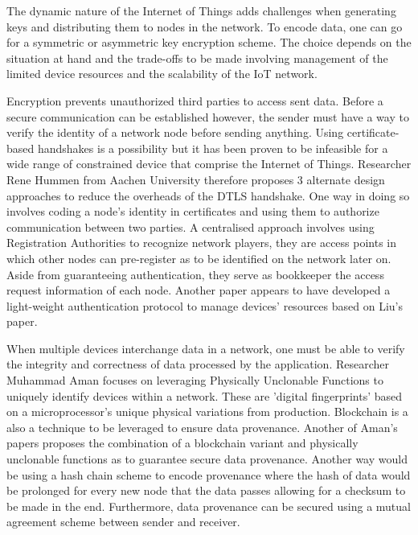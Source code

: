\documentclass[14]{article}
\begin{document}
The dynamic nature of the Internet of Things adds challenges when generating keys\cite{roman2011key} and distributing them to nodes in the network. To encode data, one can go for a symmetric\cite{gomes2014internet} or asymmetric key encryption scheme. The choice depends on the situation at hand and the trade-offs to be made involving management of the limited device resources\cite{katagi2008lightweight} and the scalability of the IoT network\cite{gomes2014internet}.

Encryption prevents unauthorized third parties to access sent data. Before a secure communication can be established however, the sender must have a way to verify the identity of a network node before sending anything. Using certificate-based handshakes\cite{hummen2014delegation} is a possibility but it has been proven to be infeasible for a wide range of constrained device that comprise the Internet of Things. Researcher Rene Hummen from Aachen University therefore proposes 3 alternate design approaches\cite{hummen2013towards} to reduce the overheads of the DTLS handshake. One way in doing so involves coding a node's identity in certificates and using them to authorize communication between two parties. 
A centralised approach involves using Registration Authorities\cite{liu2012authentication} to recognize network players, they are access points in which other nodes can pre-register as to be identified on the network later on. Aside from guaranteeing authentication, they serve as bookkeeper the access request information of each node. Another paper\cite{jan2014robust} appears to have developed a light-weight authentication protocol to manage devices' resources based on Liu's paper. 

When multiple devices interchange data in a network, one must be able to verify the integrity and correctness of data processed by the application. Researcher Muhammad Aman focuses on leveraging Physically Unclonable Functions \cite{aman2017secure} to uniquely identify devices within a network. These are 'digital fingerprints' based on a microprocessor's unique physical variations from production. Blockchain\cite{BlockChainWikipedia} is a also a technique to be leveraged to ensure data provenance. Another of Aman's papers\cite{javaid2018blockpro} proposes the combination of a blockchain variant and physically unclonable functions as to guarantee secure data provenance.
Another way would be using a hash chain scheme\cite{suhail2018data} to encode provenance where the hash of data would be prolonged for every new node that the data passes allowing for a checksum to be made in the end. Furthermore, data provenance can be secured using a mutual agreement scheme\cite{rangwala2016mutual} between sender and receiver.
\end{document}
